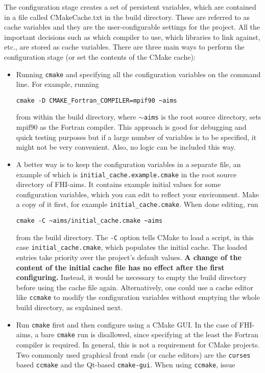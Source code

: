 The configuration stage creates a set of persistent variables, which are contained in a file called CMakeCache.txt in the build directory. These are referred to as cache variables and they are the user-configurable settings for the project. All the important decisions such as which compiler to use, which libraries to link against, etc., are stored as cache variables. There are three main ways to perform the configuration stage (or set the contents of the CMake cache):
\begin{itemize}
\item Running \texttt{cmake} and specifying all the configuration variables on the command line. For example, running
\begin{verbatim}
cmake -D CMAKE_Fortran_COMPILER=mpif90 ~aims
\end{verbatim}
  from within the build directory, where $\sim$\texttt{aims} is the root source directory, sets mpif90 as the Fortran compiler. This approach is good for debugging and quick testing purposes but if a large number of variables is to be specified, it might not be very convenient. Also, no logic can be included this way.
\item A better way is to keep the configuration variables in a separate file, an example of which is \texttt{initial\_cache.example.cmake} in the root source directory of FHI-aims. It contains example initial values for some configuration variables, which you can edit to reflect your environment. Make a copy of it first, for example \texttt{initial\_cache.cmake}. When done editing, run
\begin{verbatim}
cmake -C ~aims/initial_cache.cmake ~aims
\end{verbatim}
  from the build directory. The \texttt{-C} option tells CMake to load a script, in this case \texttt{initial\_cache.cmake}, which populates the initial cache. The loaded entries take priority over the project's default values. \textbf{A change of the content of the initial cache file has no effect after the first configuring.} Instead, it would be necessary to empty the build directory before using the cache file again. Alternatively, one could use a cache editor like \texttt{ccmake} to modify the configuration variables without emptying the whole build directory, as explained next.
\item Run  \texttt{cmake} first and then configure using a CMake GUI. In the case of FHI-aims, a bare \texttt{cmake} run is disallowed, since specifying at the least the Fortran compiler is required. In general, this is not a requirement for CMake projects. Two commonly used graphical front ends (or cache editors) are the \texttt{curses} based \texttt{ccmake} and the Qt-based \texttt{cmake-gui}. When using \texttt{ccmake}, issue

\end{itemize}
